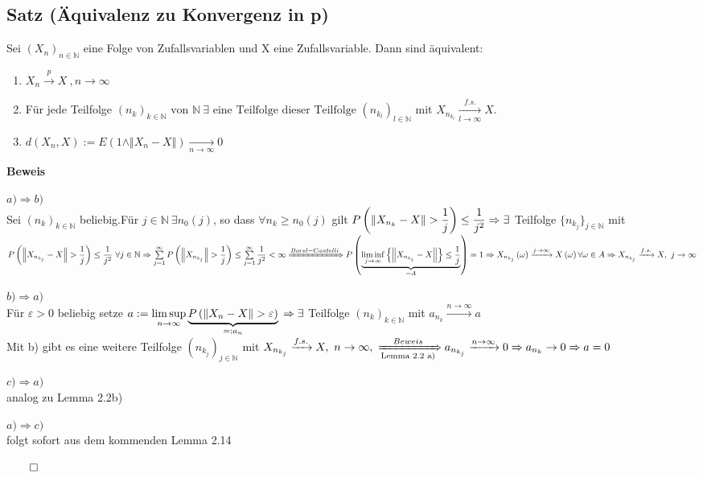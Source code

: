 \documentclass[german,10pt,oneside, fleqn, a4paper]{article}
\newcommand {\N}	{\mathbb{N}}
\newcommand{\Ra}	{\Rightarrow}
\newcommand{\lsup}[1][n]{\limsup\limits_{#1\rightarrow\infty}}
\newcommand{\linf}[1][n]{\liminf\limits_{#1\rightarrow\infty}}
\newcommand{\sm}[2][\infty]{\sum\limits_{#2}^{#1}}
\newcommand{\brc}[1]{\left(#1\right)}
\newcommand{\brac}[1]{\left\lbrace #1\right\rbrace}
\newcommand{\folge}[3][\N]{\left(#2_#3\right)_{#3\in #1}}
\newcommand{\norm}[1]{\left\Vert #1 \right\Vert}
\newcommand{\QED}{\begin{flushright}$\qed$\end{flushright}}
\newcommand{\1}[1]{1_{#1}}
\newcommand{\2}[1]{\1{\brac{#1}}}
\begin{document}
\subsection{Satz (Äquivalenz zu Konvergenz in p)}
Sei $(X_n)_{n\in\N}$ eine Folge von Zufallsvariablen und X eine Zufallsvariable. Dann sind äquivalent:\begin{enumerate}[label=(\alph*)]
\item $X_n\xrightarrow{p}X\ ,n\rightarrow\infty$
\item Für jede Teilfolge $(n_k)_{k\in\N}\text{ von }\N\ \exists\text{ eine Teilfolge dieser Teilfolge }(n_{k_l})_{l\in\N}$ mit $X_{n_{k_l}}\xrightarrow[l\rightarrow\infty]{f.s.}X$.
\item $d(X_n,X):=E(1\wedge \Vert X_n-X\Vert	)\xrightarrow[n\rightarrow\infty]{}0$
\end{enumerate}

\textbf{Beweis}\\
\begin{list}{}{}
\item $a)\Ra b)$\\
Sei $\folge{n}{k}$ beliebig.Für $j\in\N\ \exists n_0\brc{j}$, so dass $\forall n_k\geq n_0\brc{j}$ gilt  $P\brc{\norm{X_{n_k}-X}>\dfrac{1}{j}}\leq\dfrac{1}{j^2}\\
\Ra \exists$ Teilfolge $\lbrace n_{k_j}\rbrace_{j\in\N}$ mit \\
$P\brc{\norm{X_{n_{k_j}}-X}>\dfrac{1}{j}}\leq\dfrac{1}{j^2}\ \forall j\in\N\\
\Ra \sm{j=1}P\brc{\norm{X_{n_{k_j}}}>\dfrac{1}{j}}\leq\sm{j=1}\dfrac{1}{j^2}<\infty\\
\xRightarrow{Borel-Cantelli}P\brc{\underbrace{\linf[j]\brac{\norm{X_{n_{k_j}}-X}}\leq\dfrac{1}{j}}_{=A}}=1\\
\Ra X_{n_{k_j}}\brc{\omega}\xrightarrow{j\rightarrow\infty} X\brc{\omega}\forall\omega\in A\\
\Ra X_{n_{k_j}}\xrightarrow{f.s.}X,\ j\rightarrow\infty$
\item $b) \Ra a)$\\
Für $\varepsilon>0$ beliebig setze $a:=\lsup \underbrace{P\brc{\norm{X_n-X}>\varepsilon}}_{=:a_n}\\
\Ra \exists$ Teilfolge $\folge{n}{k}$ mit $a_{n_k}\xrightarrow{n\rightarrow\infty}a$\\
Mit b) gibt es eine weitere Teilfolge $\left(n_{k_j}\right)_{j\in\N}$ mit $X_{n_{k_j}}\xrightarrow{f.s.}X,\ n\rightarrow\infty,\ \xRightarrow[\text{Lemma 2.2 a)}]{Beweis}a_{n_{k_j}}\xrightarrow{n\rightarrow\infty}0\\
\Ra a_{n_k}\rightarrow 0 \Ra a=0$
\item $c)\Ra a)$\\
analog zu Lemma 2.2b)
\item $a)\Ra c)$\\
folgt sofort aus dem kommenden Lemma 2.14\QED
\end{list}
\end{document}
